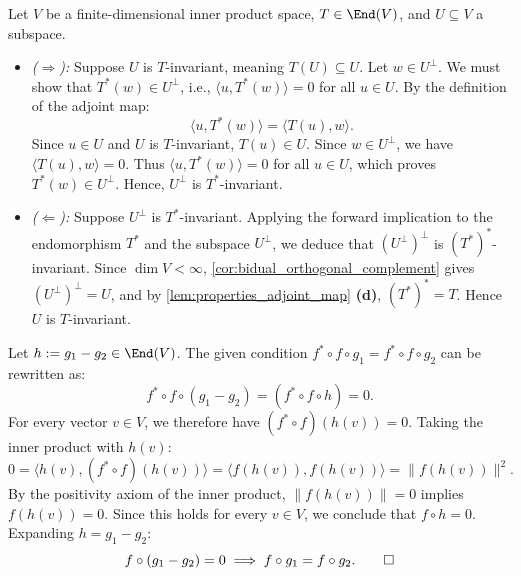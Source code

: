 \begin{exercisesolution}
\label{sol:invariant_subspaces_adjoint}
Let $V$ be a finite-di\-men\-sional inner product space, $T \in \End(V)$, and $U \subseteq V$ a subspace.
\begin{itemize}
    \item \emph{($\Rightarrow$):} Suppose $U$ is $T$-invariant, meaning $T(U) \subseteq U$.
    Let $w \in U^\perp$. We must show that $T^*(w) \in U^\perp$, i.e., $\langle u, T^*(w) \rangle = 0$ for all $u \in U$.
    By the definition of the adjoint map:
    \[
    \langle u, T^*(w) \rangle = \langle T(u), w \rangle.
    \]
    Since $u \in U$ and $U$ is $T$-invariant, $T(u) \in U$.
    Since $w \in U^\perp$, we have $\langle T(u), w \rangle = 0$.
    Thus $\langle u, T^*(w) \rangle = 0$ for all $u \in U$, which proves $T^*(w) \in U^\perp$. Hence, $U^\perp$ is $T^*$-invariant.

    \item \emph{($\Leftarrow$):} Suppose $U^\perp$ is $T^*$-invariant.
    Applying the forward implication to the endomorphism $T^*$ and the subspace $U^\perp$, we deduce that $(U^\perp)^\perp$ is $(T^*)^*$-invariant.
    Since $\dim V < \infty$, \cref{cor:bidual_orthogonal_complement} gives $(U^\perp)^\perp = U$, and by \cref{lem:properties_adjoint_map} \textbf{(d)}, $(T^*)^* = T$.
    Hence $U$ is $T$-invariant. \qedhere
\end{itemize}
\end{exercisesolution}

\begin{exercisesolution}
\label{sol:cancellation_adjoint_composite}
Let $h := g_1 - g_2 \in \End(V)$.
The given condition $f^* \circ f \circ g_1 = f^* \circ f \circ g_2$ can be rewritten as:
\[
f^* \circ f \circ (g_1 - g_2) = (f^* \circ f \circ h) = 0.
\]
For every vector $v \in V$, we therefore have $(f^* \circ f)(h(v)) = 0$.
Taking the inner product with $h(v)$:
\[
0 = \langle h(v), (f^* \circ f)(h(v)) \rangle = \langle f(h(v)), f(h(v)) \rangle = \|f(h(v))\|^2.
\]
By the positivity axiom of the inner product, $\|f(h(v))\| = 0$ implies $f(h(v)) = 0$.
Since this holds for every $v \in V$, we conclude that $f \circ h = 0$.
Expanding $h = g_1 - g_2$:
\[
f \circ (g_1 - g_2) = 0 \implies f \circ g_1 = f \circ g_2. \qedhere
\]
\end{exercisesolution}
